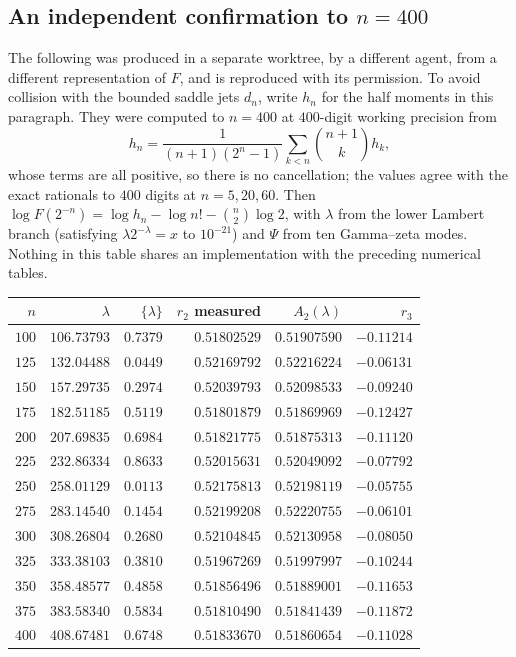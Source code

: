 \documentclass[11pt,oneside]{article}
\theoremstyle{definition}
\theoremstyle{remark}
\begin{document}
\subsection{An independent confirmation to \texorpdfstring{$n=400$}{n=400}}

The following was produced in a separate worktree, by a different agent,
from a different representation of $F$, and is reproduced with its
permission.  To avoid collision with the bounded saddle jets \(d_n\), write \(h_n\) for
the half moments in this paragraph.  They were computed to $n=400$ at $400$-digit working
precision from
\[
  h_n=\frac1{(n+1)(2^n-1)}\sum_{k<n}\binom{n+1}{k}h_k,
\]
whose terms are all positive, so there is no cancellation; the values agree
with the exact rationals to $400$ digits at $n=5,20,60$.  Then
$\log F(2^{-n})=\log h_n-\log n!-\binom n2\log2$, with $\lambda$ from the
lower Lambert branch (satisfying $\lambda2^{-\lambda}=x$ to $10^{-21}$) and
$\Psi$ from ten Gamma--zeta modes.  Nothing in this table shares an
implementation with the preceding numerical tables.

\begin{center}\small
\begin{tabular}{@{}rrrrrr@{}}
\toprule
$n$ & $\lambda$ & $\{\lambda\}$ & $r_2$ measured & $A_2(\lambda)$ & $r_3$\\
\midrule
$100$ & $106.73793$ & $0.7379$ & $0.51802529$ & $0.51907590$ & $-0.11214$\\
$125$ & $132.04488$ & $0.0449$ & $0.52169792$ & $0.52216224$ & $-0.06131$\\
$150$ & $157.29735$ & $0.2974$ & $0.52039793$ & $0.52098533$ & $-0.09240$\\
$175$ & $182.51185$ & $0.5119$ & $0.51801879$ & $0.51869969$ & $-0.12427$\\
$200$ & $207.69835$ & $0.6984$ & $0.51821775$ & $0.51875313$ & $-0.11120$\\
$225$ & $232.86334$ & $0.8633$ & $0.52015631$ & $0.52049092$ & $-0.07792$\\
$250$ & $258.01129$ & $0.0113$ & $0.52175813$ & $0.52198119$ & $-0.05755$\\
$275$ & $283.14540$ & $0.1454$ & $0.52199208$ & $0.52220755$ & $-0.06101$\\
$300$ & $308.26804$ & $0.2680$ & $0.52104845$ & $0.52130958$ & $-0.08050$\\
$325$ & $333.38103$ & $0.3810$ & $0.51967269$ & $0.51997997$ & $-0.10244$\\
$350$ & $358.48577$ & $0.4858$ & $0.51856496$ & $0.51889001$ & $-0.11653$\\
$375$ & $383.58340$ & $0.5834$ & $0.51810490$ & $0.51841439$ & $-0.11872$\\
$400$ & $408.67481$ & $0.6748$ & $0.51833670$ & $0.51860654$ & $-0.11028$\\
\bottomrule
\end{tabular}
\end{center}
\end{document}
